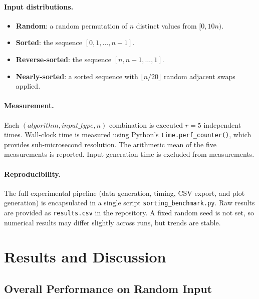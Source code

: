 \documentclass[11pt,a4paper]{article}
\begin{document}
\paragraph{Input distributions.}
\begin{itemize}[leftmargin=2em]
  \item \textbf{Random}: a random permutation of $n$ distinct values from $[0, 10n)$.
  \item \textbf{Sorted}: the sequence $[0, 1, \ldots, n-1]$.
  \item \textbf{Reverse-sorted}: the sequence $[n, n-1, \ldots, 1]$.
  \item \textbf{Nearly-sorted}: a sorted sequence with $\lfloor n/20 \rfloor$ random
        adjacent swaps applied.
\end{itemize}

\paragraph{Measurement.}
Each $(algorithm, input\_type, n)$ combination is executed $r = 5$ independent times.
Wall-clock time is measured using Python's \texttt{time.perf\_counter()}, which
provides sub-microsecond resolution. The arithmetic mean of the five measurements is
reported. Input generation time is excluded from measurements.

\paragraph{Reproducibility.}
The full experimental pipeline (data generation, timing, CSV export, and plot
generation) is encapsulated in a single script \texttt{sorting\_benchmark.py}.
Raw results are provided as \texttt{results.csv} in the repository. A fixed random
seed is not set, so numerical results may differ slightly across runs, but trends are
stable.

\section{Results and Discussion}
\label{sec:results}

\subsection{Overall Performance on Random Input}
\end{document}
